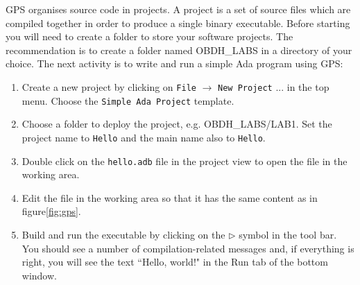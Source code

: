 GPS organises source code in projects. A project is a set of source files which are compiled together in order to produce a single binary executable. 
Before starting you will need to create a folder to store your software projects. The recommendation is to create a folder named OBDH\_LABS in a directory of your choice.
The next activity is to write and run a simple Ada program using GPS:
\begin{enumerate}
\item 	Create a new project by clicking on {\tt File} $\rightarrow$ {\tt New Project} ... in the top menu. Choose the {\tt Simple Ada Project} template.
\item	Choose a folder to deploy the project, e.g. OBDH\_LABS/LAB1. Set the project name to {\tt Hello} and the main name also to {\tt Hello}.
\item	Double click on the {\tt hello.adb} file in the project view to open the file in the working area. 
\item	Edit the file in the working area so that it has the same content as in figure\ref{fig:gps}.
\item	Build and run the executable by clicking on the $\rhd$ symbol in the tool bar. You should see a number of compilation-related messages and, if everything is right, you will see the text ``Hello, world!" in the Run tab of the bottom window.
\end{enumerate}

